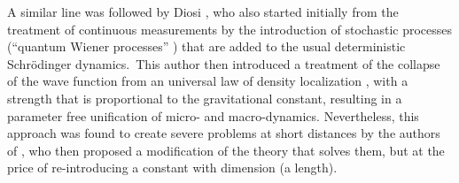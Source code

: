 \documentclass[12pt,onecolumn]{article}%
\begin{document}
A similar line was followed by Diosi \cite{Diosi}, who also started initially
from the treatment of continuous measurements \cite{Diosi-2} by the
introduction of stochastic processes (``quantum Wiener processes''
\cite{Wiener-Siegel}) that are added to the usual deterministic
Schr\"{o}dinger dynamics.\ This author then introduced a treatment of the
collapse of the wave function from an universal law of density localization
\cite{Diosi-3}, with a strength that is proportional to the gravitational
constant, resulting in a parameter free unification of micro- and
macro-dynamics. Nevertheless, this approach was found to create severe
problems at short distances by the authors of \cite{GGR}, who then proposed a
modification of the theory that solves them, but at the price of
re-introducing a constant with dimension (a length).
\end{document}
